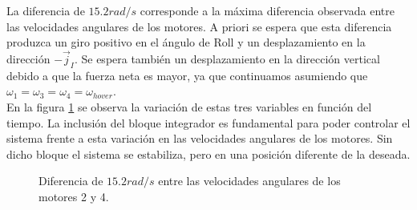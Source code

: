 \documentclass[main]{subfiles}
\begin{document}
La diferencia de $15.2rad/s$ corresponde a la m\'axima diferencia observada entre las velocidades angulares de los motores. A priori se espera que esta diferencia produzca un giro positivo en el \'angulo de Roll y un desplazamiento en la direcci\'on $-\vec{j}_I$. Se espera tambi\'en un desplazamiento en la direcci\'on vertical debido a que la fuerza neta es mayor, ya que continuamos asumiendo que $\omega_1 = \omega_3 = \omega_4 =\omega_{hover}$.\\

En la figura  \ref{fig:motor} se observa la variaci\'on de estas tres variables en funci\'on del tiempo. La inclusi\'on del bloque integrador es fundamental para poder controlar el sistema frente a esta variaci\'on en las velocidades angulares de los motores. Sin dicho bloque el sistema se estabiliza, pero en una posici\'on diferente de la deseada.\\

\begin{figure}
  \centering
 
  \caption{Diferencia de $15.2 rad/s$ entre las velocidades angulares de los motores 2 y 4.}
  \label{fig:motor}
\end{figure}
\end{document}
